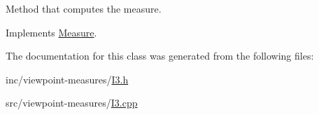 Method that computes the measure. 



Implements \hyperlink{class_measure_aed88fe46b2a609ab5948e5f3c891321d}{Measure}.



The documentation for this class was generated from the following files\+:\begin{DoxyCompactItemize}
\item 
inc/viewpoint-\/measures/\hyperlink{_i3_8h}{I3.\+h}\item 
src/viewpoint-\/measures/\hyperlink{_i3_8cpp}{I3.\+cpp}\end{DoxyCompactItemize}
